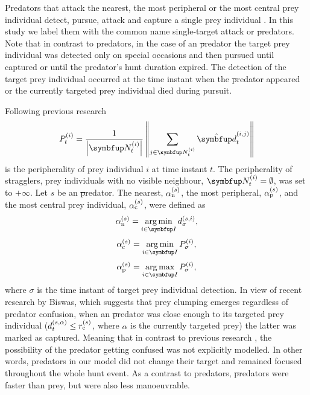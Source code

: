 Predators that attack the nearest, the most peripheral or the most central prey individual detect, pursue, attack and capture a single prey individual \cite{demsar2014simulated}. In this study we label them with the common name single-target attack or \st predators. Note that in contrast to \hdaa predators, in the case of an \st predator the target prey individual was detected only on special occasions and then pursued until captured or until the predator's hunt duration expired. The detection of the target prey individual occurred at the time instant when the \st predator appeared or the currently targeted prey individual died during pursuit. 

Following previous research \cite{demsar2014simulated,hemelrijk2000towards,hemelrijk2005construction,hildenbrandt2010selforganized} 
%
\begin{equation}
P^{(i)}_t = \frac{1}{\left|\set{N}^{(i)}_t\right|}\left\| \sum_{j \in \set{N}^{(i)}_t} \uvec{d}^{(i,j)}_t \right\|
\label{equation:peripherality}
\end{equation}
%
is the peripherality of prey individual $i$ at time instant $t$. The peripherality of stragglers, prey individuals with no visible neighbour, \ie $\set{N}^{(i)}_t=\emptyset$, was set to $+\infty$. Let $s$ be an \st predator. The nearest, $\alpha^{(s)}_\textnormal{n}$, the most peripheral, $\alpha^{(s)}_\textnormal{p}$, and the most central prey individual, $\alpha^{(s)}_\textnormal{c}$, were defined as
%
\begin{equation}
\alpha^{(s)}_\textnormal{n} = \argmin_{i \in \set{I}} d^{(s,i)}_\sigma,
\end{equation}
%
\begin{equation}
\alpha^{(s)}_\textnormal{c} = \argmin_{i \in \set{I}} P^{(i)}_\sigma,
\end{equation}
%
\begin{equation}
\alpha^{(s)}_\textnormal{p} = \argmax_{i \in \set{I}} P^{(i)}_\sigma,
\end{equation}
%
where $\sigma$ is the time instant of target prey individual detection. In view of recent research by Biswas\etal, which suggests that prey clumping emerges regardless of predator confusion\cite{biswas2014causes}, when an \st predator was close enough to its targeted prey individual (\ie $d^{(s,\alpha)}_t\leq r^{(s)}_\textnormal{c}$, where $\alpha$ is the currently targeted prey) the latter was marked as captured. Meaning that in contrast to previous research \cite{demsar2015simulating,kunz2006prey,olson2013predator,olson2016evolution}, the possibility of the predator getting confused was not explicitly modelled. In other words, predators in our model did not change their target and remained focused throughout the whole hunt event. As a contrast to \hdaa predators, \st predators were faster than prey, but were also less manoeuvrable.

